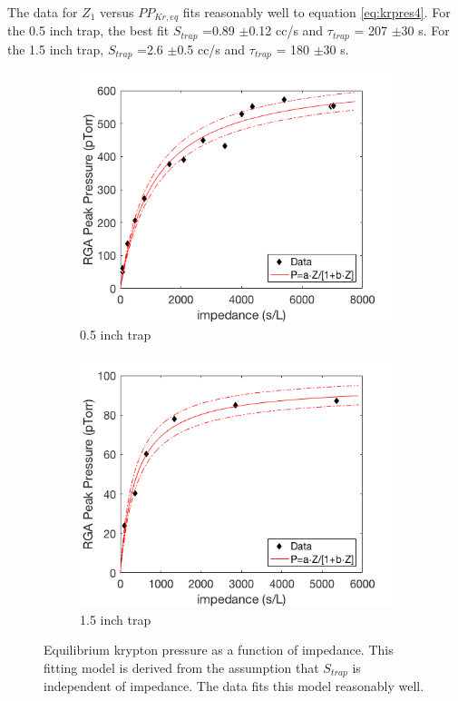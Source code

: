 \documentclass[12pt]{article}
\begin{document}
The data for $Z_1$ versus $PP_{Kr,eq}$ fits reasonably well to equation \ref{eq:krpres4}. For the 0.5 inch trap, the best fit $S_{trap}$ =0.89 $\pm$0.12 cc/s and $\tau_{trap}$ = 207 $\pm$30 s. For the 1.5 inch trap, $S_{trap}$ =2.6 $\pm$0.5 cc/s and $\tau_{trap}$ = 180 $\pm$30 s.
\begin{figure}[h!]
\centering
\begin{subfigure}{0.5\textwidth}
  \centering
  \includegraphics[width=\textwidth]{Figures/SLAC_imp_response.png}
  \caption{0.5 inch trap}
\end{subfigure}%
\begin{subfigure}{0.5\textwidth}
  \centering
  \includegraphics[width=\textwidth]{Figures/SLAC_imp_response_1p5in.png}
  \caption{1.5 inch trap}
\end{subfigure}
\caption{Equilibrium krypton pressure as a function of impedance. This fitting model is derived from the assumption that $S_{trap}$ is independent of impedance. The data fits this model reasonably well.} 
\label{fig:impresponse}
\end{figure}
\end{document}
